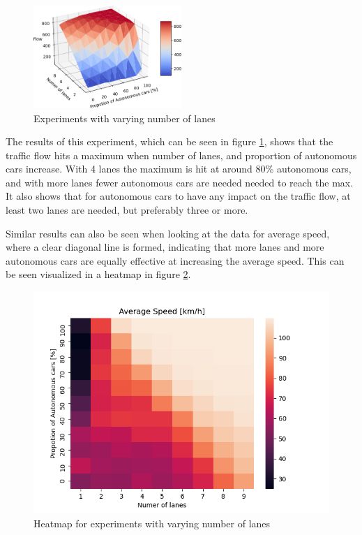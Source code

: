 \begin{figure}[H]
    \centering
    \includegraphics[width=0.5\textwidth]{images/Experiment2.png}
    \caption{Experiments with varying number of lanes}
    \label{fig:experiment2}
\end{figure}

The results of this experiment, which can be seen in figure \ref{fig:experiment2}, shows that the traffic flow hits a maximum when number of lanes, and proportion of autonomous cars increase. With 4 lanes the maximum is hit at around 80\% autonomous cars, and with more lanes  fewer autonomous cars are needed needed to  reach the max. It also shows that for autonomous cars to have any impact on the traffic  flow, at least two lanes are needed, but preferably three or more.

Similar results can also be seen when looking at the data for average speed, where a clear diagonal line is formed, indicating that more lanes and more autonomous cars are equally effective at increasing the average speed. This can be seen visualized in a heatmap in figure \ref{fig:experiment2heatmap}. 
\begin{figure}[H]
    \centering
    \includegraphics[width=\linewidth]{images/Experiment2-Speed.png}
    \caption{Heatmap for experiments with varying number of lanes}
    \label{fig:experiment2heatmap}
\end{figure}



